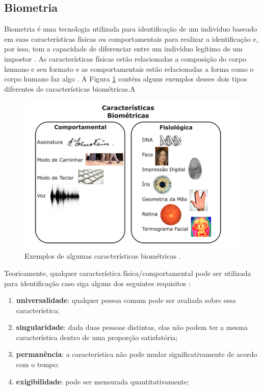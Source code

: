 \subsection{Biometria}
\label{sec:biometria}
	Biometria é uma tecnologia utilizada para identificação de um indivíduo baseado
	em suas características físicas ou comportamentais para realizar a identificação
	e, por isso, tem a capacidade de diferenciar entre um indivíduo legítimo de um
	impostor \cite{hong}. As características físicas estão relacionadas a composição
	do corpo humano e seu formato e as comportamentais estão relacionadas a forma
	como o corpo humano faz algo \cite{drovetto}. A Figura
	\ref{caracteristicasBiometricas} contém alguns exemplos desses dois tipos
	diferentes de características biométricas.A

	\begin{figure}[H]
		\begin{center}
			\includegraphics[scale=0.5]{figuras/2.FundamentacaoTeorica/caracteristicasBiometricas.png}
		\end{center}
		\caption{Exemplos de algumas características biométricas \cite{drovetto}.}
		\label{caracteristicasBiometricas}
	\end{figure}


	Teoricamente, qualquer característica física/comportamental pode ser utilizada
	para identificação caso siga alguns dos seguintes requisitos \cite{milene}:

	\begin{enumerate}
		\item \textbf{universalidade}: qualquer pessoa comum pode ser avaliada sobre essa característica;
		\item \textbf{singularidade}: dada duas pessoas distintas, elas não podem ter a mesma característica dentro de uma proporção satisfatória;
		\item \textbf{permanência}: a característica não pode mudar significativamente de acordo com o tempo;
		\item \textbf{exigibilidade}: pode ser mensurada quantitativamente;
	\end{enumerate}

